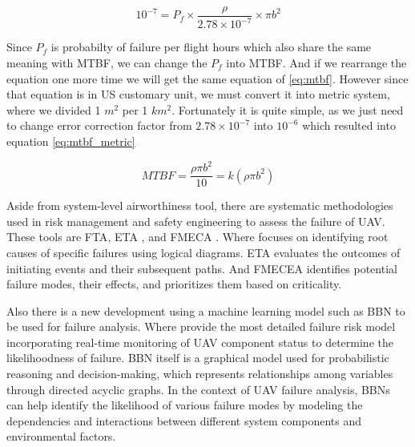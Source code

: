 \documentclass[12pt]{report}
\begin{document}
            \begin{equation}\label{eq:PF}
                10^{-7}= P_f \times \frac{\rho}{2.78 \times 10^{-7}} \times \pi b^2
            \end{equation}

            Since \(P_f\) is probabilty of failure per flight hours which also share the same meaning with \ac{MTBF}, we
            can change the \(P_f\) into MTBF. And if we rearrange the equation one more time we will get the same
            equation of \ref{eq:mtbf}. However since that equation is in US customary unit, we must convert it into
            metric system, where we divided 1 \(m^2\) per 1 \(km^2\). Fortunately it is quite simple, as we just need to
            change error correction factor from \(2.78 \times 10^{-7}\) into \(10^{-6}\) which resulted into equation
            \ref{eq:mtbf_metric}

            \begin{equation}\label{eq:mtbf_metric}
                MTBF = \frac{\rho \pi b^2}{10} = k(\rho \pi b^2)
            \end{equation}

            Aside from system-level airworthiness tool, there are systematic methodologies used in risk management and
            safety engineering to assess the failure of UAV. These tools are \ac{FTA}, \ac{ETA} , and \ac{FMECA}
            \cite{barr_preliminary_2017}. Where focuses on identifying root causes of specific failures using logical
            diagrams. ETA evaluates the outcomes of initiating events and their subsequent paths. And FMECEA identifies
            potential failure modes, their effects, and prioritizes them based on criticality.

            Also there is a new development using a machine learning model such as \ac{BBN} \cite{ancel_real-time_2017}
            to be used for failure analysis. Where \cite{ancel_real-time_2017} provide the most detailed failure risk
            model incorporating real-time monitoring of UAV component status to determine the likelihoodness of failure.
            BBN itself is a graphical model used for probabilistic reasoning and decision-making, which represents
            relationships among variables through directed acyclic graphs. In the context of UAV failure analysis, BBNs
            can help identify the likelihood of various failure modes by modeling the dependencies and interactions
            between different system components and environmental factors.
\end{document}
